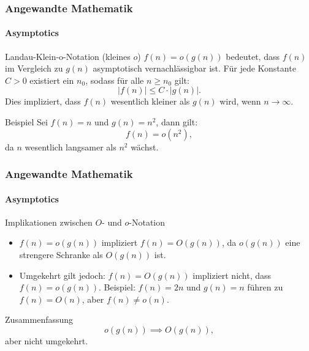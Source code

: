 \documentclass{beamer}
\begin{document}
\begin{frame}
    \frametitle{Angewandte Mathematik}
    \framesubtitle{Asymptotics}
    
    \begin{block}{Landau-Klein-o-Notation (kleines \( o \))}
        \( f(n) = o(g(n)) \) bedeutet, dass \( f(n) \) im Vergleich zu \( g(n) \) asymptotisch vernachlässigbar ist. Für jede Konstante \( C > 0 \) existiert ein \( n_0 \), sodass für alle \( n \geq n_0 \) gilt:
        \[
        |f(n)| \leq C \cdot |g(n)|.
        \]
        Dies impliziert, dass \( f(n) \) wesentlich kleiner als \( g(n) \) wird, wenn \( n \to \infty \).
    \end{block}

    \begin{exampleblock}{Beispiel}
        Sei \( f(n) = n \) und \( g(n) = n^2 \), dann gilt:
        \[
        f(n) = o(n^2),
        \]
        da \( n \) wesentlich langsamer als \( n^2 \) wächst.
    \end{exampleblock}
\end{frame}

\begin{frame}
    \frametitle{Angewandte Mathematik}
    \framesubtitle{Asymptotics}
 
    \begin{block}{Implikationen zwischen \( O \)- und \( o \)-Notation}
        \begin{itemize}
            \item \( f(n) = o(g(n)) \) impliziert \( f(n) = O(g(n)) \), da \( o(g(n)) \) eine strengere Schranke als \( O(g(n)) \) ist.
            \item Umgekehrt gilt jedoch: \( f(n) = O(g(n)) \) impliziert nicht, dass \( f(n) = o(g(n)) \). Beispiel: \( f(n) = 2n \) und \( g(n) = n \) führen zu \( f(n) = O(n) \), aber \( f(n) \neq o(n) \).
        \end{itemize}
    \end{block}

    \begin{exampleblock}{Zusammenfassung}
        \[
        o(g(n)) \implies O(g(n)),
        \]
        aber nicht umgekehrt.
    \end{exampleblock}
\end{frame}
\end{document}
